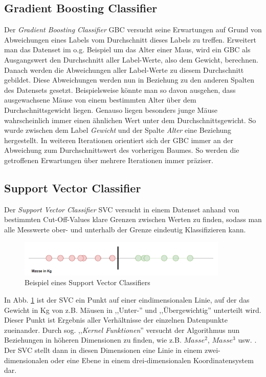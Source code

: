 \subsection{Gradient Boosting Classifier}
Der \textit{Gradient Boosting Classifier} GBC versucht seine Erwartungen auf Grund von Abweichungen eines Labels vom 
Durchschnitt dieses Labels zu treffen. Erweitert man das Datenset im o.g. Beispiel um das Alter einer Maus, wird 
ein GBC als Ausgangswert den Durchschnitt aller Label-Werte, also dem Gewicht, berechnen. Danach werden die 
Abweichungen aller Label-Werte zu diesem Durchschnitt gebildet. Diese Abweichungen werden nun in Beziehung zu den 
anderen Spalten des Datensets gesetzt. Beispielsweise könnte man so davon ausgehen, dass ausgewachsene Mäuse von einem 
bestimmten Alter über dem Durchschnittsgewicht liegen. Genauso liegen besonders junge Mäuse wahrscheinlich immer
einen ähnlichen Wert unter dem Durchschnittsgewicht. So wurde zwischen dem Label \textit{Gewicht} und der Spalte 
\textit{Alter} eine Beziehung hergestellt. In weiteren Iterationen orientiert sich der GBC immer an der Abweichung 
zum Durchschnittswert des vorherigen Baumes. So werden die getroffenen Erwartungen über mehrere Iterationen immer 
präziser.
\newpage
\subsection{Support Vector Classifier}
Der \textit{Support Vector Classifier} SVC versucht in einem Datenset anhand von bestimmten Cut-Off-Values klare Grenzen 
zwischen Werten zu finden, sodass man alle Messwerte ober- und unterhalb der Grenze eindeutig Klassifizieren 
kann.

\begin{figure}[h]
    \centering
    \includegraphics[width=10.0cm]{pic/SVC_1D.png}
    \caption{Beispiel eines Support Vector Classifiers}
    \label{fig:SVC_1D}
\end{figure}

In Abb. \ref{fig:SVC_1D} ist der SVC ein Punkt auf einer eindimensionalen Linie, auf der das Gewicht in Kg von z.B. 
Mäusen in ,,Unter-'' und ,,Übergewichtig'' unterteilt wird. Dieser Punkt ist Ergebnis aller Verhältnisse der einzelnen
Datenpunkte zueinander. Durch sog. ,,\textit{Kernel Funktionen}'' versucht der Algorithmus nun Beziehungen 
in höheren Dimensionen zu finden, wie z.B. $Masse^2$, $Masse^3$ usw. . Der SVC stellt dann in diesen Dimensionen 
eine Linie in einem zwei-dimensionalen oder eine Ebene in einem drei-dimensionalen Koordinatensystem dar.\\


